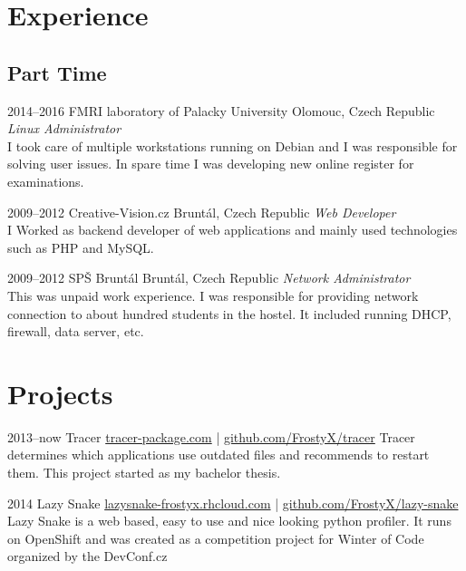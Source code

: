 \documentclass[]{friggeri-cv}
\begin{document}
\section{Experience}
\subsection{Part Time}
\begin{entrylist}

\entry
{2014--2016}
{FMRI laboratory of Palacky University}
{Olomouc, Czech Republic}
{\emph{Linux Administrator} \\
I took care of multiple workstations running on Debian and I was responsible for solving user issues. In spare time I was developing new online register for examinations.}

\entry
{2009--2012}
{Creative-Vision.cz}
{Bruntál, Czech Republic}
{\emph{Web Developer} \\
I Worked as backend developer of web applications and mainly used technologies such as PHP and MySQL.}

\entry
{2009--2012}
{SPŠ Bruntál}
{Bruntál, Czech Republic}
{\emph{Network Administrator} \\
This was unpaid work experience. I was responsible for providing network connection to about hundred students in the hostel. It included running DHCP, firewall, data server, etc.}

\end{entrylist}


\section{Projects}

\begin{entrylist}

\entry
{2013--now}
{Tracer}
{\href{http://tracer-package.com}{tracer-package.com} | \href{https://github.com/FrostyX/tracer}{github.com/FrostyX/tracer}}
{Tracer determines which applications use outdated files and recommends to restart them. This project started as my bachelor thesis.}

\entry
{2014}
{Lazy Snake}
{\href{http://lazysnake-frostyx.rhcloud.com/}{lazysnake-frostyx.rhcloud.com} | \href{https://github.com/FrostyX/lazy-snake}{github.com/FrostyX/lazy-snake}}
{Lazy Snake is a web based, easy to use and nice looking python profiler. It runs on OpenShift and was created as a competition project for Winter of Code organized by the DevConf.cz}

\end{entrylist}
\end{document}
